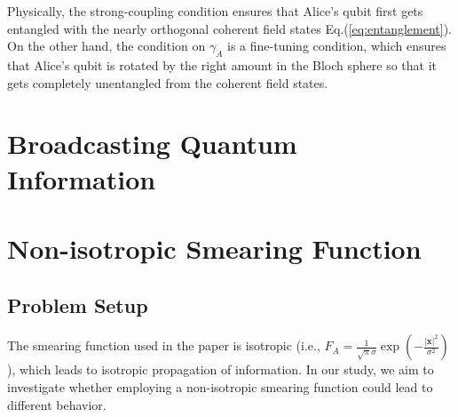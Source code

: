 \documentclass[a4paper,12pt]{article}
\begin{document}
Physically, the strong-coupling condition ensures that Alice's qubit first gets entangled with the nearly orthogonal coherent field states Eq.(\ref{eq:entanglement}).
On the other hand, the condition on $\gamma_A$ is a fine-tuning condition, which ensures that Alice's qubit is rotated by the right amount in the Bloch sphere so that it gets completely unentangled from the coherent field states. 



\section{Broadcasting Quantum Information}


\section{Non-isotropic Smearing Function}
\subsection{Problem Setup}
The smearing function used in the paper is isotropic (i.e., $F_A = \frac{1}{\sqrt{\pi}\sigma} \exp\left(-\frac{|\mathbf{x}|^2}{\sigma^2}\right)$), which leads to isotropic propagation of information. In our study, we aim to investigate whether employing a non-isotropic smearing function could lead to different behavior.
\end{document}
